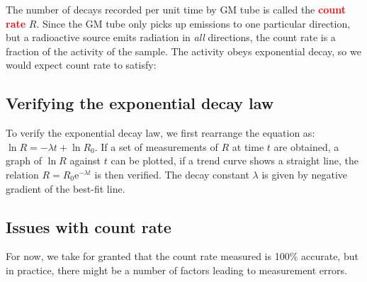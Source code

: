 \documentclass[a4paper,12pt]{book}
\newcommand{\keypoint}[1]{\textbf{\textcolor{red}{#1}}}
\renewenvironment{marginfigure}[1][]{\begin{figure}[htbp]\centering}{\end{figure}}
\newcommand{\tcbhighmath}[1]{\boxed{#1}}
\newcommand{\keypoint}[1]{\textbf{\textcolor{red}{#1}}}
\begin{document}
The number of decays recorded per unit time by GM tube is called the \keypoint{count rate} $R$. Since the GM tube only picks up emissions to one particular direction, but a radioactive source emits radiation in \emph{all} directions, the count rate is a fraction of the activity of the sample. The activity obeys exponential decay, so we would expect count rate to satisfy: 

\subsection*{Verifying the exponential decay law}

\begin{marginfigure}
	\vspace*{-8pt}
	\centering
	\vspace*{-12pt}
\end{marginfigure}

To verify the exponential decay law, we first rearrange the equation as: $\ln R = -\lambda t + \ln R_0$. If a set of measurements of $R$ at time $t$ are obtained, a graph of $\ln R$ against $t$ can be plotted, if a trend curve shows a straight line, the relation $R=R_0\mathrm{e}^{-\lambda t}$ is then verified. The decay constant $\lambda$ is given by negative gradient of the best-fit line.

\subsection*{Issues with count rate}

For now, we take for granted that the count rate measured is 100\% accurate, but in practice, there might be a number of factors leading to measurement errors.
\end{document}
